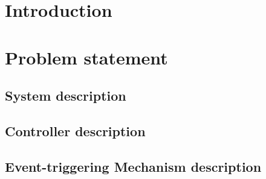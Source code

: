 \documentclass{article}
\begin{document}
\section{Introduction}

\section{Problem statement}
\subsection{System description}
\subsection{Controller description}
\subsection{Event-triggering Mechanism description}


\end{document}
